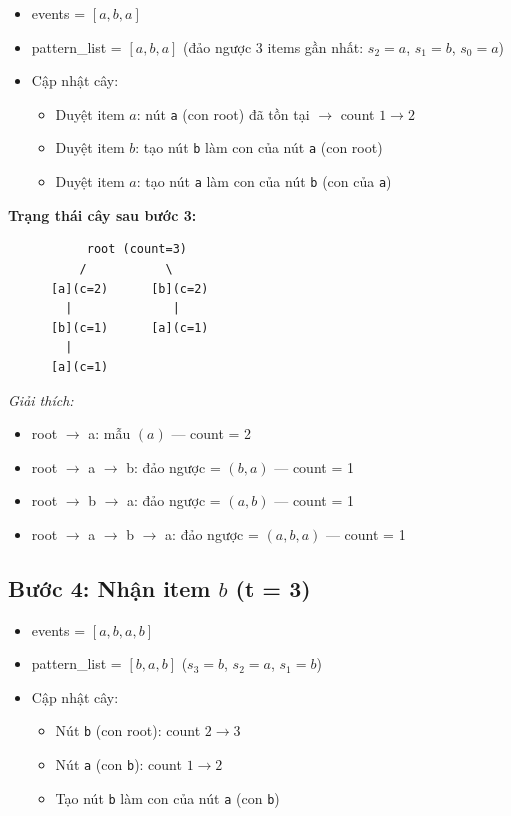 \documentclass[a4paper,12pt]{report}
\begin{document}
\begin{itemize}
    \item events = $[a, b, a]$
    \item pattern\_list = $[a, b, a]$ (đảo ngược 3 items gần nhất: $s_2=a$, $s_1=b$, $s_0=a$)
    \item Cập nhật cây:
    \begin{itemize}
        \item Duyệt item $a$: nút \texttt{a} (con root) đã tồn tại $\rightarrow$ count $1 \rightarrow 2$
        \item Duyệt item $b$: tạo nút \texttt{b} làm con của nút \texttt{a} (con root)
        \item Duyệt item $a$: tạo nút \texttt{a} làm con của nút \texttt{b} (con của \texttt{a})
    \end{itemize}
\end{itemize}

\textbf{Trạng thái cây sau bước 3:}
\begin{verbatim}
           root (count=3)
          /           \
      [a](c=2)      [b](c=2)
        |              |
      [b](c=1)      [a](c=1)
        |
      [a](c=1)
\end{verbatim}

\textit{Giải thích:}
\begin{itemize}
    \item root $\rightarrow$ a: mẫu $(a)$ --- count = 2
    \item root $\rightarrow$ a $\rightarrow$ b: đảo ngược = $(b, a)$ --- count = 1
    \item root $\rightarrow$ b $\rightarrow$ a: đảo ngược = $(a, b)$ --- count = 1
    \item root $\rightarrow$ a $\rightarrow$ b $\rightarrow$ a: đảo ngược = $(a, b, a)$ --- count = 1
\end{itemize}

\subsection{Bước 4: Nhận item $b$ (t = 3)}

\begin{itemize}
    \item events = $[a, b, a, b]$
    \item pattern\_list = $[b, a, b]$ ($s_3=b$, $s_2=a$, $s_1=b$)
    \item Cập nhật cây:
    \begin{itemize}
        \item Nút \texttt{b} (con root): count $2 \rightarrow 3$
        \item Nút \texttt{a} (con \texttt{b}): count $1 \rightarrow 2$
        \item Tạo nút \texttt{b} làm con của nút \texttt{a} (con \texttt{b})
    \end{itemize}
\end{itemize}
\end{document}
